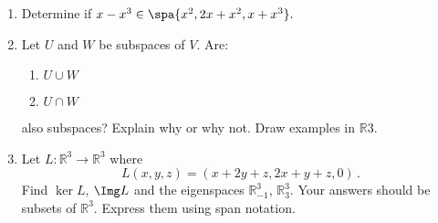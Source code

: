 


\begin{enumerate}


\item \label{subspaces_spanning_sets_polynolmial_span} {Determine} if  
$x-x^3 \in \spa\{ x^2, 2x+x^2, x+x^3 \}.$


\item\label{UandV} \hypertarget{intersections}{Let} $U$ and $W$ be subspaces of $V$.  Are:
\label{UcapV}
\begin{enumerate}
\item $U\cup W$
\item $U\cap W$
\end{enumerate}
also subspaces?  Explain why or why not.  Draw examples in $\mathbb{R}3$.



\item Let $L:{\mathbb R}^3\to {\mathbb R}^3$ where \[L(x,y,z)=(x+2y+z,2x+y+z,0)\, .\] 
Find $\ker L$, $\Img L$ and the eigenspaces ${\mathbb R}^3_{-1}$, ${\mathbb R}^3_{3}$. Your answers should be subsets of ${\mathbb R}^3$. Express them using span notation.

\end{enumerate}

